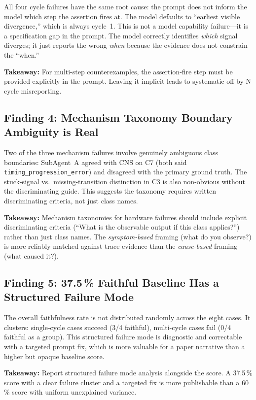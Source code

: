 \documentclass[11pt,a4paper]{article}
\begin{document}
All four cycle failures have the same root cause: the prompt does not inform
the model which step the assertion fires at. The model defaults to ``earliest
visible divergence,'' which is always cycle~1. This is not a model capability
failure---it is a specification gap in the prompt. The model correctly
identifies \emph{which} signal diverges; it just reports the wrong \emph{when}
because the evidence does not constrain the ``when.''

\textbf{Takeaway:} For multi-step counterexamples, the assertion-fire step must
be provided explicitly in the prompt. Leaving it implicit leads to systematic
off-by-N cycle misreporting.

\subsection{Finding 4: Mechanism Taxonomy Boundary Ambiguity is Real}

Two of the three mechanism failures involve genuinely ambiguous class
boundaries: SubAgent~A agreed with CNS on C7 (both said
\texttt{timing\_progression\_error}) and disagreed with the primary ground
truth. The stuck-signal vs.\ missing-transition distinction in C3 is also
non-obvious without the discriminating guide. This suggests the taxonomy
requires written discriminating criteria, not just class names.

\textbf{Takeaway:} Mechanism taxonomies for hardware failures should include
explicit discriminating criteria (``What is the observable output if this class
applies?'') rather than just class names. The \emph{symptom-based} framing
(what do you observe?) is more reliably matched against trace evidence than the
\emph{cause-based} framing (what caused it?).

\subsection{Finding 5: 37.5\,\% Faithful Baseline Has a Structured Failure Mode}

The overall faithfulness rate is not distributed randomly across the eight cases.
It clusters: single-cycle cases succeed (3/4 faithful), multi-cycle cases
fail (0/4 faithful as a group). This structured failure mode is diagnostic and
correctable with a targeted prompt fix, which is more valuable for a paper
narrative than a higher but opaque baseline score.

\textbf{Takeaway:} Report structured failure mode analysis alongside the score.
A 37.5\,\% score with a clear failure cluster and a targeted fix is more
publishable than a 60\,\% score with uniform unexplained variance.
\end{document}
